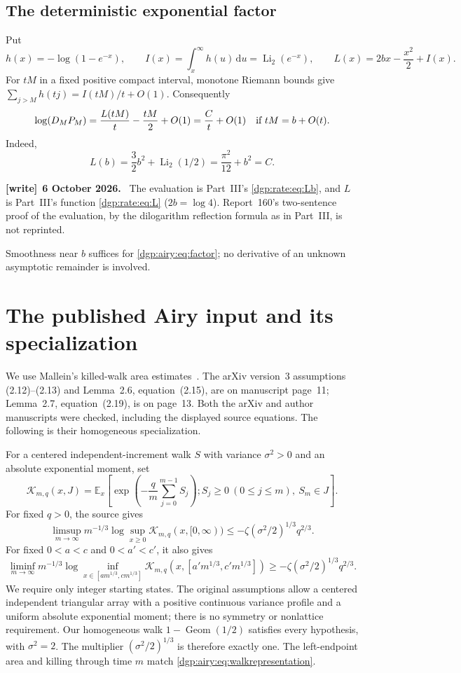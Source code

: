 \documentclass[11pt,letterpaper]{article}
\numberwithin{equation}{section}
\theoremstyle{remark}\newtheorem{remark}[theorem]{Remark}
\newcommand{\EE}{\mathbb E}
\newcommand{\dd}{\,\mathrm d}
\newenvironment{writenote}[1][]{\par\smallskip\begingroup\small
 \noindent\textbf{[write]}\if\relax\detokenize{#1}\relax\else~\textbf{#1.}\fi\ }%
 {\par\endgroup\smallskip}
\begin{document}
\subsection{The deterministic exponential factor}
Put
\[
 h(x)=-\log(1-e^{-x}),\qquad
 I(x)=\int_x^\infty h(u)\dd u=\operatorname{Li}_2(e^{-x}),
 \qquad L(x)=2bx-\frac{x^2}2+I(x).
\]
For $tM$ in a fixed positive compact interval, monotone Riemann bounds
give $\sum_{j>M}h(tj)=I(tM)/t+O(1)$. Consequently
\begin{equation}\label{dgp:airy:eq:factor}
 \log(D_MP_M)=\frac{L(tM)}t-\frac{tM}2+O(1)
             =\frac Ct+O(1)\quad\hbox{if }tM=b+O(t).
\end{equation}
Indeed,
\[
 L(b)=\frac32b^2+\operatorname{Li}_2(1/2)
      =\frac{\pi^2}{12}+b^2=C.
\]
\begin{writenote}[6 October 2026]
The evaluation is Part~III's \eqref{dgp:rate:eq:Lb}, and $L$ is Part~III's function \eqref{dgp:rate:eq:L} ($2b=\log4$). Report~160's two-sentence proof of the evaluation, by the dilogarithm reflection formula as in Part~III, is not reprinted.
\end{writenote}
Smoothness near $b$ suffices for \eqref{dgp:airy:eq:factor}; no derivative of
an unknown asymptotic remainder is involved.

\section{The published Airy input and its specialization}\label{dgp:airy:sec:source}
We use Mallein's killed-walk area estimates~\cite{mallein}.
The arXiv version~3 assumptions (2.12)--(2.13) and
Lemma~2.6, equation~(2.15), are on manuscript page~11;
Lemma~2.7, equation~(2.19), is on page~13. Both the arXiv and author
manuscripts were checked, including the displayed source equations.
The following is their homogeneous specialization.

For a centered independent-increment walk $S$ with variance $\sigma^2>0$
and an absolute exponential moment, set
\[
 \mathcal K_{m,q}(x,J)=
 \EE_x\!\left[\exp\!\left(-\frac qm\sum_{j=0}^{m-1}S_j\right);
        S_j\geq0\ (0\leq j\leq m),\ S_m\in J\right].
\]
For fixed $q>0$, the source gives
\begin{equation}\label{dgp:airy:eq:malleinupper}
 \limsup_{m\to\infty}m^{-1/3}
 \log\sup_{x\geq0}\mathcal K_{m,q}(x,[0,\infty))
 \leq-\zeta(\sigma^2/2)^{1/3}q^{2/3}.
\end{equation}
For fixed $0<a<c$ and $0<a'<c'$, it also gives
\begin{equation}\label{dgp:airy:eq:malleinlower}
 \liminf_{m\to\infty}m^{-1/3}
 \log\inf_{x\in[am^{1/3},cm^{1/3}]}
 \mathcal K_{m,q}(x,[a'm^{1/3},c'm^{1/3}])
 \geq-\zeta(\sigma^2/2)^{1/3}q^{2/3}.
\end{equation}
We require only integer starting states. The original assumptions
allow a centered independent triangular array with a positive
continuous variance profile and a uniform absolute exponential moment;
there is no symmetry or nonlattice requirement. Our homogeneous walk
$1-\operatorname{Geom}(1/2)$ satisfies every hypothesis, with
$\sigma^2=2$. The multiplier $(\sigma^2/2)^{1/3}$ is therefore exactly
one. The left-endpoint area and killing through time $m$ match
\eqref{dgp:airy:eq:walkrepresentation}.
\end{document}
